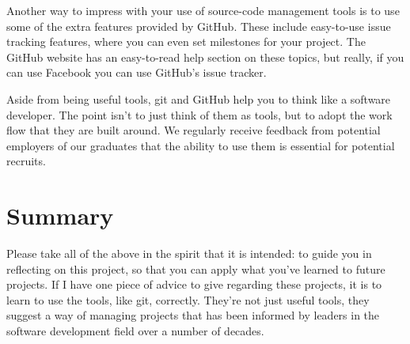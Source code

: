 Another way to impress with your use of source-code management tools is to use some of the extra features provided by GitHub.
These include easy-to-use issue tracking features, where you can even set milestones for your project.
The GitHub website has an easy-to-read help section on these topics, but really, if you can use Facebook you can use GitHub's issue tracker.

Aside from being useful tools, git and GitHub help you to think like a software developer.
The point isn't to just think of them as tools, but to adopt the work flow that they are built around.
We regularly receive feedback from potential employers of our graduates that the ability to use them is essential for potential recruits.
 
\section*{Summary}
Please take all of the above in the spirit that it is intended: to guide you in reflecting on this project, so that you can apply what you've learned to future projects.
If I have one piece of advice to give regarding these projects, it is to learn to use the tools, like git, correctly.
They're not just useful tools, they suggest a way of managing projects that has been informed by leaders in the software development field over a number of decades.



